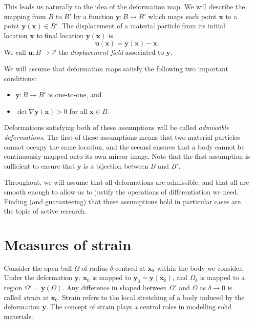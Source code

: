 \documentclass[
  letterpaper,
  DIV=11,
  numbers=noendperiod]{scrreprt}
\theoremstyle{plain}
\theoremstyle{remark}
\begin{document}
This leads us naturally to the idea of the deformation map. We will
describe the mapping from \(B\) to \(B'\) by a function
\({\boldsymbol{y}}:B\to B'\) which maps each point \({\boldsymbol{x}}\)
to a point \({\boldsymbol{y}}({\boldsymbol{x}})\in B'\). The
displacement of a material particle from its initial location
\({\boldsymbol{x}}\) to final location
\({\boldsymbol{y}}({\boldsymbol{x}})\) is
\[{\boldsymbol{u}}({\boldsymbol{x}}) = {\boldsymbol{y}}({\boldsymbol{x}})-{\boldsymbol{x}}.\]
We call \({\boldsymbol{u}}:B\to{\mathcal{V}}\) the \emph{displacement
field} associated to \({\boldsymbol{y}}\).

We will assume that deformation maps satisfy the following two important
conditions:

\begin{itemize}
\item
  \({\boldsymbol{y}}:B\to B'\) is one-to-one, and
\item
  \(\det\nabla{\boldsymbol{y}}({\boldsymbol{x}})>0\) for all
  \({\boldsymbol{x}}\in B\).
\end{itemize}

Deformations satisfying both of these assumptions will be called
\emph{admissible deformations}. The first of these assumptions means
that two material particles cannot occupy the same location, and the
second ensures that a body cannot be continuously mapped onto its own
mirror image. Note that the first assumption is sufficient to ensure
that \({\boldsymbol{y}}\) is a bijection between \(B\) and \(B'\).

Throughout, we will assume that all deformations are admissible, and
that all are smooth enough to allow us to justify the operations of
differentiation we need. Finding (and guaranteeing) that these
assumptions hold in particular cases are the topic of active research.

\section{Measures of strain}\label{measures-of-strain}

Consider the open ball \(\Omega\) of radius \(\delta\) centred at
\({\boldsymbol{x}}_0\) within the body we consider. Under the
deformation \({\boldsymbol{y}}\), \({\boldsymbol{x}}_0\) is mapped to
\({\boldsymbol{y}}_0={\boldsymbol{y}}({\boldsymbol{x}}_0)\), and
\(\Omega_\delta\) is mapped to a region
\(\Omega'={\boldsymbol{y}}(\Omega)\). Any difference in shaped between
\(\Omega'\) and \(\Omega\) as \(\delta\to0\) is called \emph{strain} at
\({\boldsymbol{x}}_0\). Strain refers to the local stretching of a body
induced by the deformation \({\boldsymbol{y}}\). The concept of strain
plays a central roles in modelling solid materials.
\end{document}

